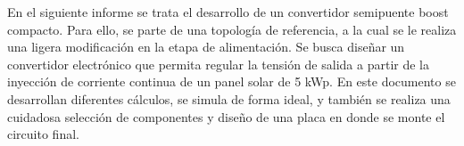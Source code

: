 \documentclass[
	spanish, %
	letterpaper, oneside
]{article}
\begin{document}
\templatePortrait

\templatePagecfg

\begin{abstractd}
	En el siguiente informe se trata el desarrollo de un convertidor semipuente boost compacto. Para ello, se parte de una topología de referencia, a la cual se le realiza una ligera modificación en la etapa de alimentación. Se busca diseñar un convertidor electrónico que permita regular la tensión de salida a partir de la inyección de corriente continua de un panel solar de 5 kWp. En este documento se desarrollan diferentes cálculos, se simula de forma ideal, y también se realiza una cuidadosa selección de componentes y diseño de una placa en donde se monte el circuito final.
\end{abstractd}

\templateIndex

\templateFinalcfg



\end{document}
